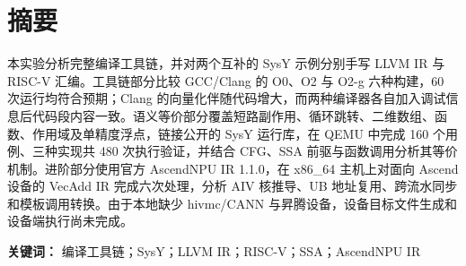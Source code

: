 \section*{摘要}
本实验分析完整编译工具链，并对两个互补的 SysY 示例分别手写 LLVM IR 与 RISC-V 汇编。工具链部分比较 GCC/Clang 的 O0、O2 与 O2-g 六种构建，60 次运行均符合预期；Clang 的向量化伴随代码增大，而两种编译器各自加入调试信息后代码段内容一致。语义等价部分覆盖短路副作用、循环跳转、二维数组、函数、作用域及单精度浮点，链接公开的 SysY 运行库，在 QEMU 中完成 160 个用例、三种实现共 480 次执行验证，并结合 CFG、SSA 前驱与函数调用分析其等价机制。进阶部分使用官方 AscendNPU IR 1.1.0，在 x86\_64 主机上对面向 Ascend 设备的 VecAdd IR 完成六次处理，分析 AIV 核推导、UB 地址复用、跨流水同步和模板调用转换。由于本地缺少 hivmc/CANN 与昇腾设备，设备目标文件生成和设备端执行尚未完成。

\noindent\textbf{关键词：} 编译工具链；SysY；LLVM IR；RISC-V；SSA；AscendNPU IR
